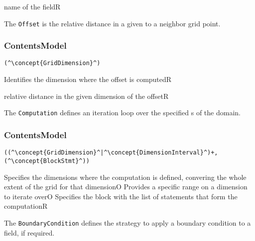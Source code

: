 \begin{HIRAttributes}
	{name of the field}{R}
\end{HIRAttributes}


The {\tt Offset} is the relative distance in a given  to a neighbor grid point.

\subsubsection*{ContentsModel}{}

\begin{lstlisting}[style=default,frame=none]
(^\concept{GridDimension}^)
\end{lstlisting}

\begin{HIRChildElements}
	{Identifies the dimension where the offset is computed}{R}
\end{HIRChildElements}

\begin{HIRAttributes}
	{relative distance in the given dimension of the offset}{R}
\end{HIRAttributes}

The {\tt Computation} defines an iteration loop over the specified s of the domain.

\subsubsection*{ContentsModel}{}

\begin{lstlisting}[style=default,frame=none]
((^\concept{GridDimension}^|^\concept{DimensionInterval}^)+,(^\concept{BlockStmt}^))
\end{lstlisting}

\begin{HIRChildElements}
	{Specifies the dimensions where the computation is defined,
		convering the whole extent of the grid for that dimension}{O}
	{Provides a specific range on a dimension to iterate over}{O}
	{Specifies the block with the list of statements that form the computation}{R}
\end{HIRChildElements}


The {\tt BoundaryCondition} defines the strategy to apply a boundary condition to a field, if required.

